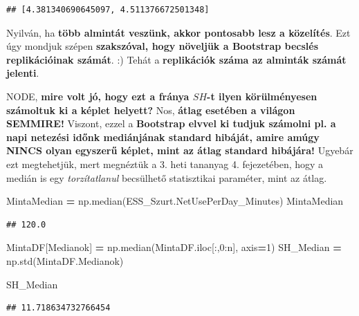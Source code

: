 \documentclass[
]{book}
\newenvironment{Shaded}{\begin{snugshade}}{\end{snugshade}}
\newcommand{\DecValTok}[1]{\textcolor[rgb]{0.00,0.00,0.81}{#1}}
\newcommand{\NormalTok}[1]{#1}
\newcommand{\OperatorTok}[1]{\textcolor[rgb]{0.81,0.36,0.00}{\textbf{#1}}}
\newcommand{\StringTok}[1]{\textcolor[rgb]{0.31,0.60,0.02}{#1}}
\begin{document}
\begin{Shaded}
\begin{Highlighting}[]
\NormalTok{[SH\_Keplet, SH\_Bootstrap]}
\end{Highlighting}
\end{Shaded}

\begin{verbatim}
## [4.381340690645097, 4.511376672501348]
\end{verbatim}

Nyilván, ha \textbf{több almintát veszünk, akkor pontosabb lesz a közelítés}. Ezt úgy mondjuk szépen \textbf{szakszóval, hogy növeljük a Bootstrap becslés replikációinak számát}. :) Tehát a \textbf{replikációk száma az alminták számát jelenti}.

NODE, \textbf{mire volt jó, hogy ezt a fránya \(SH\)-t ilyen körülményesen számoltuk ki a képlet helyett?} Nos, \textbf{átlag esetében a világon SEMMIRE!}
Viszont, ezzel a \textbf{Bootstrap elvvel ki tudjuk számolni pl. a napi netezési időnk mediánjának standard hibáját, amire amúgy NINCS olyan egyszerű képlet, mint az átlag standard hibájára!}
Ugyebár ezt megtehetjük, mert megnéztük a 3. heti tananyag 4. fejezetében, hogy a medián is egy \emph{torzítatlanul} becsülhető statisztikai paraméter, mint az átlag.

\begin{Shaded}
\begin{Highlighting}[]
\NormalTok{MintaMedian }\OperatorTok{=}\NormalTok{ np.median(ESS\_Szurt.NetUsePerDay\_Minutes)}
\NormalTok{MintaMedian}
\end{Highlighting}
\end{Shaded}

\begin{verbatim}
## 120.0
\end{verbatim}

\begin{Shaded}
\begin{Highlighting}[]
\NormalTok{MintaDF[}\StringTok{\textquotesingle{}Medianok\textquotesingle{}}\NormalTok{] }\OperatorTok{=}\NormalTok{ np.median(MintaDF.iloc[:,}\DecValTok{0}\NormalTok{:n], axis}\OperatorTok{=}\DecValTok{1}\NormalTok{)}
\NormalTok{SH\_Median }\OperatorTok{=}\NormalTok{ np.std(MintaDF.Medianok)}

\NormalTok{SH\_Median}
\end{Highlighting}
\end{Shaded}

\begin{verbatim}
## 11.718634732766454
\end{verbatim}
\end{document}
